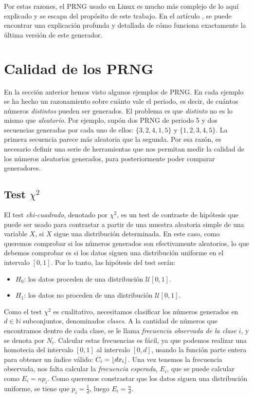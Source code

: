 Por estas razones, el PRNG usado en Linux es mucho más complejo de lo aquí explicado y se escapa del propósito de este trabajo. En el artículo \cite{lacharme2012}, se puede encontrar una explicación profunda y detallada de cómo funciona exactamente la última versión de este generador.

\section{Calidad de los PRNG}

En la sección anterior hemos visto algunos ejemplos de PRNG. En cada ejemplo se ha hecho un razonamiento sobre cuánto vale el  periodo, es decir, de cuántos números \textit{distintos} pueden ser generados. El problema es que \textit{distinto} no es lo mismo que \textit{aleatorio}. Por ejemplo, supón dos PRNG de periodo 5 y dos secuencias generadas por cada uno de ellos: $\{3,2,4,1,5\}$ y $\{1,2,3,4,5\}$. La primera secuencia parece más aleatoria que la segunda. Por esa razón, es necesario definir una serie de herramientas que nos permitan medir la calidad de los números aleatorios generados, para posteriormente poder comparar generadores.

\subsection{Test $\chi^2$}

El test \textit{chi-cuadrado}, denotado por $\chi^2$, es un test de contraste de hipótesis que puede ser usado para contrastar a partir de una muestra aleatoria simple de una variable $X$, si $X$ sigue una distribución determinada. En este caso, como queremos comprobar si los números generados son efectivamente aleatorios, lo que debemos comprobar es si los datos siguen una distribución uniforme en el intervalo $[0,1]$. Por lo tanto, las hipótesis del test serán:
\begin{itemize}
\item $H_0$: los datos proceden de una distribución $\mathcal{U}[0,1]$.
\item $H_1$: los datos no proceden de una distribución $\mathcal{U}[0,1]$.
\end{itemize}
Como el test $\chi^2$ es cualitativo, necesitamos clasificar los números generados en $d\in\mathbb{N}$ subconjuntos, denominados \textit{clases}. A la cantidad de números que encontramos dentro de cada clase, se le llama \textit{frecuencia observada de la clase} $i$, y se denota por $N_i$. Calcular estas frecuencias es fácil, ya que podemos realizar una homotecia del intervalo $[0,1]$ al intervalo $[0,d]$, usando la función parte entera para obtener un índice válido: $C_i=\left\lfloor d x_i \right\rfloor$. Una vez tenemos la frecuencia observada, nos falta calcular la \textit{frecuencia esperada}, $E_i$, que se puede calcular como $E_i=np_i$. Como queremos constrastar que los datos siguen una distribución uniforme, se tiene que $p_i=\frac{1}{d}$, luego $E_i=\frac{n}{d}$. 

